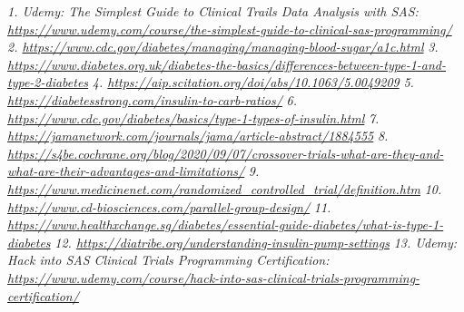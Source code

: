 \documentclass[
]{ctexart}
\begin{document}
\emph{1. Udemy: The Simplest Guide to Clinical Trails Data Analysis with
SAS:
\url{https://www.udemy.com/course/the-simplest-guide-to-clinical-sas-programming/}}
\emph{2.
\url{https://www.cdc.gov/diabetes/managing/managing-blood-sugar/a1c.html}}
\emph{3.
\url{https://www.diabetes.org.uk/diabetes-the-basics/differences-between-type-1-and-type-2-diabetes}}
\emph{4. \url{https://aip.scitation.org/doi/abs/10.1063/5.0049209}}
\emph{5. \url{https://diabetesstrong.com/insulin-to-carb-ratios/}}
\emph{6.
\url{https://www.cdc.gov/diabetes/basics/type-1-types-of-insulin.html}}
\emph{7.
\url{https://jamanetwork.com/journals/jama/article-abstract/1884555}}
\emph{8.
\url{https://s4be.cochrane.org/blog/2020/09/07/crossover-trials-what-are-they-and-what-are-their-advantages-and-limitations/}}
\emph{9.
\url{https://www.medicinenet.com/randomized_controlled_trial/definition.htm}}
\emph{10. \url{https://www.cd-biosciences.com/parallel-group-design/}}
\emph{11.
\url{https://www.healthxchange.sg/diabetes/essential-guide-diabetes/what-is-type-1-diabetes}}
\emph{12.
\url{https://diatribe.org/understanding-insulin-pump-settings}}
\emph{13. Udemy: Hack into SAS Clinical Trials Programming
Certification:
\url{https://www.udemy.com/course/hack-into-sas-clinical-trials-programming-certification/}}
\end{document}
